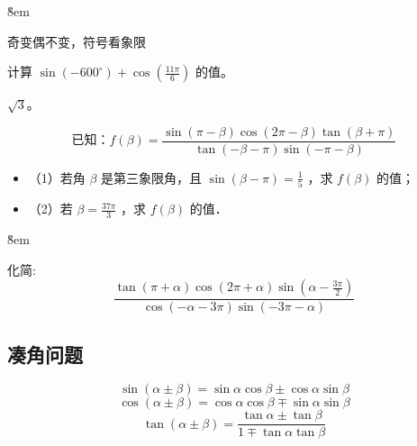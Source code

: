 \v{8em}

\begin{theorem}[诱导公式]
    奇变偶不变，符号看象限
\end{theorem}

\begin{example}
    计算 $\sin(-600^\circ) + \cos(\frac{11\pi}{6})$ 的值。
\end{example}
\begin{solution}
    $\sqrt{3}$。
\end{solution}
\vspace{2em}

\begin{problem}
$$\text{已知：}f(\beta)=\frac{\sin (\pi-\beta) \cos (2 \pi-\beta) \tan (\beta+\pi)}{\tan (-\beta-\pi) \sin (-\pi-\beta)}$$
\begin{itemize}
    \item （1）若角 $\beta$ 是第三象限角，且 $\sin (\beta-\pi)=\frac{1}{5}$ ，求 $f(\beta)$ 的值；
    \item （2）若 $\beta=\frac{37 \pi}{3}$ ，求 $f(\beta)$ 的值．
\end{itemize}
\end{problem}

\v{8em}

\begin{problem}
化简:
$$
    \frac{\tan (\pi+\alpha) \cos (2 \pi+\alpha) \sin \left(\alpha-\frac{3 \pi}{2}\right)}{\cos (-\alpha-3 \pi) \sin (-3 \pi-\alpha)}
$$
\end{problem}


\subsection{凑角问题}

\begin{theorem}[两角和与差的三角函数]
    $$ \sin(\alpha \pm \beta) = \sin\alpha\cos\beta \pm \cos\alpha\sin\beta $$
    $$ \cos(\alpha \pm \beta) = \cos\alpha\cos\beta \mp \sin\alpha\sin\beta $$
    $$ \tan(\alpha \pm \beta) = \frac{\tan\alpha \pm \tan\beta}{1 \mp \tan\alpha\tan\beta} $$
\end{theorem}

